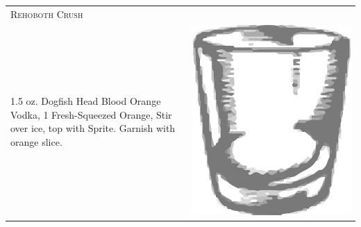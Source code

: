 \documentclass{article}
\begin{document}
\begin{tabular}{p{2in} p{0.5in}}
  \multicolumn{2}{p{3in}}{\centering\Huge\textsc{Rehoboth Crush}} \\ 
  
   \vspace{-0.1in}1.5 oz. Dogfish Head Blood Orange Vodka, 1 Fresh-Squeezed
    Orange, Stir over ice, top with Sprite. Garnish with orange
    slice. &  \vspace{-0.1in} \includegraphics{rocks_glass.png}
\end{tabular}
\end{document}
